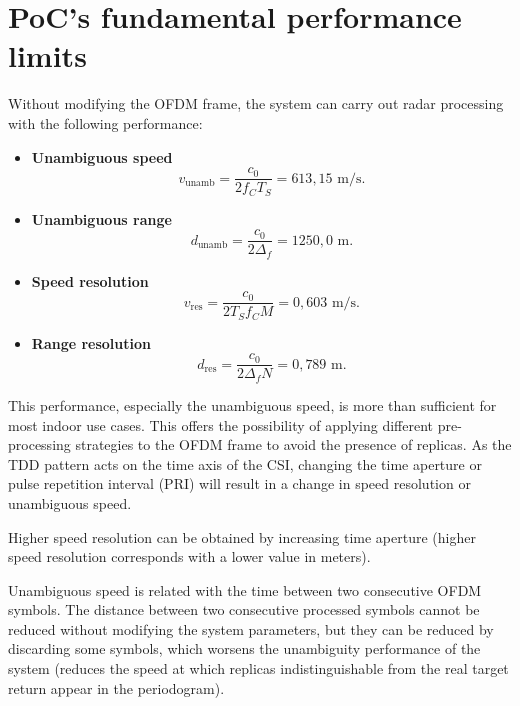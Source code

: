\section{PoC's fundamental performance limits}

Without modifying the OFDM frame, the system can carry out radar processing with the following performance:

\begin{itemize}
	\item \textbf{Unambiguous speed}
	\vspace{-\baselineskip} %
	\begin{equation}
		v_{\text{unamb}} = \frac{c_0}{2f_C T_S} = 613,15\text{ m/s}.
	\end{equation}
	
	\item \textbf{Unambiguous range}
	\begin{equation}
		d_{\text{unamb}} = \frac{c_0}{2\Delta_f} = 1250,0\text{ m}.
	\end{equation}
	\item \textbf{Speed resolution}
	\begin{equation}
		v_{\text{res}} = \frac{c_0}{2T_Sf_CM} = 0,603 \text{ m/s}.
	\end{equation} 
	\item \textbf{Range resolution}
	\begin{equation}
		d_{\text{res}} = \frac{c_0}{2\Delta_fN} = 0,789 \text{ m}.
	\end{equation}  
\end{itemize}
	
	This performance, especially the unambiguous speed, is more than sufficient for most indoor use cases. 
	This offers the possibility of applying different pre-processing strategies to the OFDM frame to avoid the presence of replicas. 
	As the TDD pattern acts on the time axis of the CSI, changing the time aperture or pulse repetition interval (PRI) will result in a change in speed resolution or unambiguous speed.
	
	Higher speed resolution can be obtained by increasing time aperture (higher speed resolution corresponds with a lower value in meters).
	
	Unambiguous speed is related with the time between two consecutive OFDM symbols. The distance between two consecutive processed symbols cannot be reduced without modifying the system parameters, but they can be reduced by discarding some symbols, which worsens the unambiguity performance of the system (reduces the speed at which replicas indistinguishable from the real target return appear in the periodogram).
	
